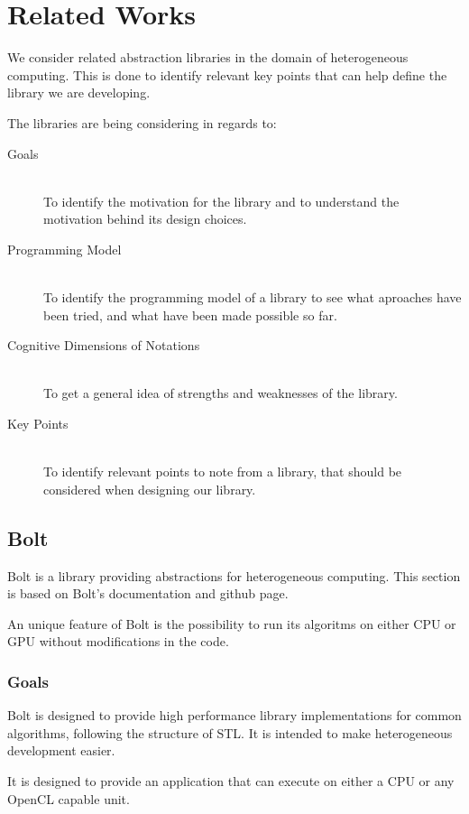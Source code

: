 \section{Related Works}
We consider related abstraction libraries in the domain of heterogeneous computing. This is done to identify relevant key points that can help define the library we are developing.

The libraries are being considering in regards to:
\begin{description}
\item[Goals] \hfill \\
To identify the motivation for the library and to understand the motivation behind its design choices.
\item[Programming Model] \hfill \\
To identify the programming model of a library to see what aproaches have been tried, and what have been made possible so far.
\item[Cognitive Dimensions of Notations] \hfill \\
To get a general idea of strengths and weaknesses of the library.
\item[Key Points] \hfill \\
To identify relevant points to note from a library, that should be considered when designing our library.
\end{description}


\subsection{Bolt}
Bolt is a library providing abstractions for heterogeneous computing. This section is based on Bolt's documentation\cite{boltDoc} and github page\cite{boltGithub}.

An unique feature of Bolt is the possibility to run its algoritms on either CPU or GPU without modifications in the code.

\subsubsection{Goals}
Bolt is designed to provide high performance library implementations for common algorithms, following the structure of STL. It is intended to make heterogeneous development easier.

It is designed to provide an application that can execute on either a CPU or any OpenCL capable unit.

